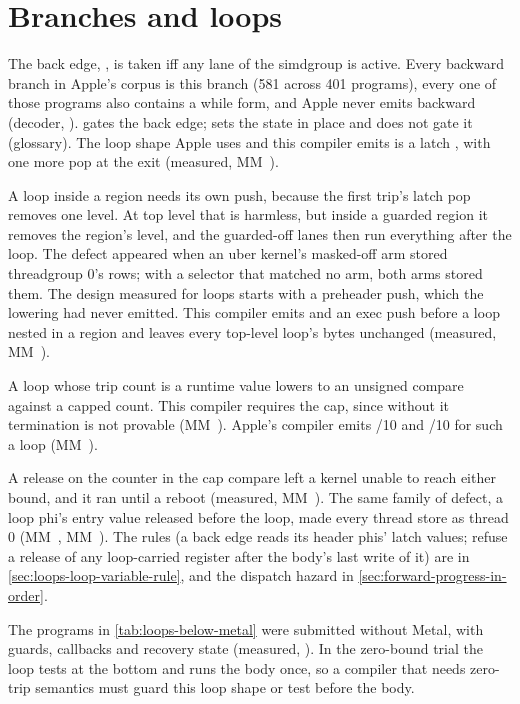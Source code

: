 \section{Branches and loops}\label{sec:branches-back-edges}

The back edge, , is taken iff any lane of the simdgroup is active. Every backward
branch in Apple's corpus is this branch (581 across 401 programs), every one of those programs also contains a while form, and
Apple never emits  backward (decoder, ).  gates the
back edge;  sets the state in place and does not gate it (glossary). The loop shape Apple uses and this compiler emits is a latch , with one more pop at the exit (measured, MM~).

A loop inside a region needs its own push, because the first trip's latch pop removes one level. At top level that is
harmless, but inside a guarded region it removes the region's level, and the guarded-off lanes then run everything after
the loop. The defect appeared when an uber kernel's masked-off arm stored threadgroup 0's rows; with a selector that matched no
arm, both arms stored them. The design measured for loops starts with a preheader push, which the lowering had never
emitted. This compiler emits  and an exec push before a loop nested in a region and leaves every top-level loop's bytes unchanged
(measured, MM~).

A loop whose trip count is a runtime value lowers to an unsigned compare against a capped
count. This compiler requires the cap, since without it termination is not provable (MM~). Apple's compiler emits /10 and /10 for such a loop
(MM~).

A release on the counter in the cap compare left a kernel unable to reach
either bound, and it ran until a reboot (measured, MM~). The same
family of defect, a loop phi's entry value released before the loop, made every thread store as thread 0 (MM~,
MM~). The rules (a back edge reads its header phis' latch values; refuse a release of any loop-carried register
after the body's last write of it) are in \cref{sec:loops-loop-variable-rule}, and the dispatch hazard in
\cref{sec:forward-progress-in-order}.

The programs in \cref{tab:loops-below-metal} were submitted without Metal, with guards, callbacks and recovery state
(measured, ). In the zero-bound trial the loop tests at the bottom and runs the
body once, so a compiler that needs zero-trip semantics must guard this loop shape or test before the body.

